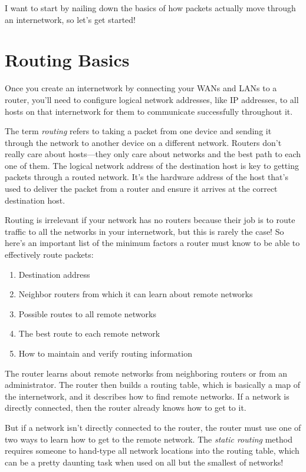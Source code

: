 I want to start by nailing down the basics of how packets actually move
through an internetwork, so let's get started!

\section{Routing Basics}

Once you create an internetwork by connecting your WANs and LANs to a
router, you'll need to configure logical network addresses, like IP
addresses, to all hosts on that internetwork for them to communicate
successfully throughout it.

The term \emph{routing} refers to taking a packet from one device and
sending it through the network to another device on a different network.
Routers don't really care about hosts---they only care about networks
and the best path to each one of them. The logical network address of
the destination host is key to getting packets through a routed network.
It's the hardware address of the host that's used to deliver the packet
from a router and ensure it arrives at the correct destination host.

Routing is irrelevant if your network has no routers because their job
is to route traffic to all the networks in your internetwork, but this
is rarely the case! So here's an important list of the minimum factors a
router must know to be able to effectively route packets:

\begin{enumerate}
\tightlist
\item
  Destination address
\item
  Neighbor routers from which it can learn about remote networks
\item
  Possible routes to all remote networks
\item
  The best route to each remote network
\item
  How to maintain and verify routing information
\end{enumerate}

The router learns about remote networks from neighboring routers or from
an administrator. The router then builds a routing table, which is
basically a map of the internetwork, and it describes how to find remote
networks. If a network is directly connected, then the router already
knows how to get to it.

But if a network isn't directly connected to the router, the router must
use one of two ways to learn how to get to the remote network. The
\emph{static routing} method requires someone to hand-type all network
locations into the routing table, which can be a pretty daunting task
when used on all but the smallest of networks!

